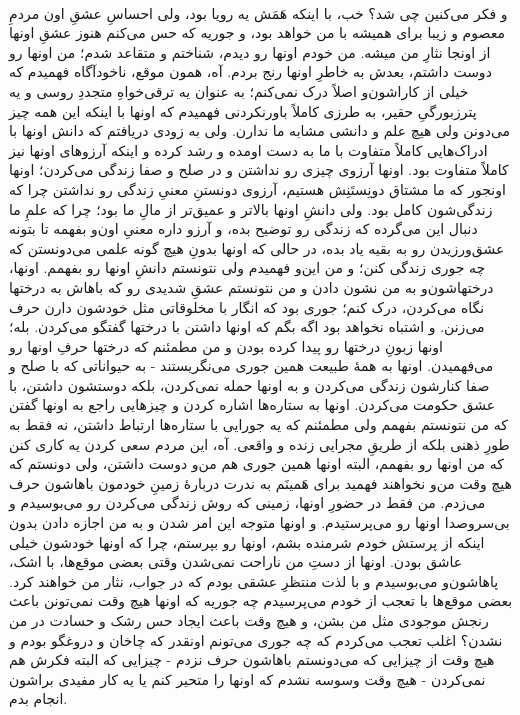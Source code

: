 \documentclass[12pt]{book}
\begin{document}
    \paragraph{}
    و فکر می‌کنین چی شد؟ خب، با اینکه هَمَش یه رویا بود، ولی احساسِ عشقِ اون مردمِ معصوم و زیبا برای همیشه با من خواهد بود، و جوریه که حس می‌کنم هنوز عشقِ اونها از اونجا نثارِ من میشه. من خودم اونها رو دیدم، شناختم و متقاعد شدم؛ من اونها رو دوست داشتم، بعدش به خاطرِ اونها رنج بردم. آه، همون موقع، ناخودآگاه فهمیدم که خیلی از کاراشون‌و اصلاً درک نمی‌کنم؛ به عنوان یه ترقی‌خواهِ متجددِ روسی و یه پترزبورگیِ حقیر، به طرزی کاملاً باورنکردنی فهمیدم که اونها با اینکه این همه چیز می‌دونن ولی هیچ علم و دانشی مشابه ما ندارن. ولی به زودی دریافتم که دانش اونها با ادراک‌هایی کاملاً متفاوت با ما به دست اومده و رشد کرده و اینکه آرزوهای اونها نیز کاملاً متفاوت بود. اونها آرزوی چیزی رو نداشتن و در صلح و صفا زندگی می‌کردن؛ اونها اونجور که ما مشتاق دونِستَنِش هستیم، آرزوی دونستنِ معنیِ زندگی رو نداشتن چرا که زندگی‌شون کامل بود. ولی دانشِ اونها بالاتر و عمیق‌تر از مالِ ما بود؛ چرا که علمِ ما دنبال این می‌گرده که زندگی رو توضیح بده، و آرزو داره معنیِ اون‌و بفهمه تا بتونه عشق‌ورزیدن رو به بقیه یاد بده، در حالی که اونها بدونِ هیچ گونه علمی می‌دونستن که چه جوری زندگی کنن؛ و من این‌و فهمیدم ولی نتونستم دانشِ اونها رو بفهمم. اونها، درختهاشون‌و به من نشون دادن و من نتونستم عشقِ شدیدی رو که باهاش به درختها نگاه می‌کردن، درک کنم؛ جوری بود که انگار با مخلوقاتی مثل خودشون دارن حرف می‌زنن. و اشتباه نخواهد بود اگه بگم که اونها داشتن با درختها گفتگو می‌کردن. بله؛ اونها زبونِ درختها رو پیدا کرده بودن و من مطمئنم که درختها حرفِ اونها رو می‌فهمیدن. اونها به همهٔ طبیعت همین جوری می‌نگریستند - به حیواناتی که با صلح و صفا کنارشون زندگی می‌کردن و به اونها حمله نمی‌کردن، بلکه دوستشون داشتن، با عشق حکومت می‌کردن. اونها به ستاره‌ها اشاره کردن و چیزهایی راجع به اونها گفتن که من نتونستم بفهمم ولی مطمئنم که یه جورایی با ستاره‌ها ارتباط داشتن، نه فقط به طورِ ذهنی بلکه از طریقِ مجرایی زنده و واقعی. آه، این مردم سعی کردن یه کاری کنن که من اونها رو بفهمم، البته اونها همین جوری هم من‌و دوست داشتن، ولی دونستم که هیچ وقت من‌و نخواهند فهمید برای هَمینَم به ندرت دربارهٔ زمینِ خودمون باهاشون حرف می‌زدم. من فقط در حضورِ اونها، زمینی که روش زندگی می‌کردن رو می‌بوسیدم و بی‌سروصدا اونها رو می‌پرستیدم. و اونها متوجه این امر شدن و به من اجازه دادن بدون اینکه از پرستش خودم شرمنده بشم، اونها رو بپرستم، چرا که اونها خودشون خیلی عاشق بودن. اونها از دستِ من ناراحت نمی‌شدن وقتی بعضی موقع‌ها، با اشک، پاهاشون‌و می‌بوسیدم و با لذت منتظرِ عشقی بودم که در جواب، نثار من خواهند کرد. بعضی موقع‌ها با تعجب از خودم می‌پرسیدم چه جوریه که اونها هیچ وقت نمی‌تونن باعث رنجش موجودی مثل من بشن، و هیچ وقت باعث ایجاد حس رشک و حسادت در من نشدن؟ اغلب تعجب می‌کردم که چه جوری می‌تونم اونقدر که چاخان و دروغگو بودم و هیچ وقت از چیزایی که می‌دونستم باهاشون حرف نزدم - چیزایی که البته فکرش هم نمی‌کردن - هیچ وقت وسوسه نشدم که اونها را متحیر کنم یا یه کار مفیدی براشون انجام بدم.
\end{document}
